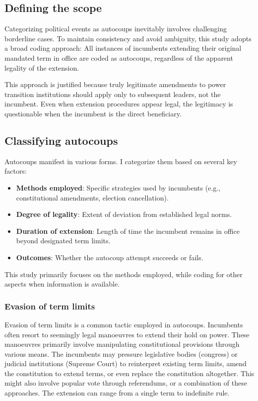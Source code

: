 \documentclass[
  12pt,
]{report}
\begin{document}
\subsection{Defining the scope}\label{defining-the-scope}

Categorizing political events as autocoups inevitably involves
challenging borderline cases. To maintain consistency and avoid
ambiguity, this study adopts a broad coding approach: All instances of
incumbents extending their original mandated term in office are coded as
autocoups, regardless of the apparent legality of the extension.

This approach is justified because truly legitimate amendments to power
transition institutions should apply only to subsequent leaders, not the
incumbent. Even when extension procedures appear legal, the legitimacy
is questionable when the incumbent is the direct beneficiary.

\subsection{Classifying autocoups}\label{sec-classify}

Autocoups manifest in various forms. I categorize them based on several
key factors:

\begin{itemize}
\item
  \textbf{Methods employed}: Specific strategies used by incumbents
  (e.g., constitutional amendments, election cancellation).
\item
  \textbf{Degree of legality}: Extent of deviation from established
  legal norms.
\item
  \textbf{Duration of extension}: Length of time the incumbent remains
  in office beyond designated term limits.
\item
  \textbf{Outcomes}: Whether the autocoup attempt succeeds or fails.
\end{itemize}

This study primarily focuses on the methods employed, while coding for
other aspects when information is available.

\subsubsection*{Evasion of term limits}\label{evasion-of-term-limits}

Evasion of term limits is a common tactic employed in autocoups.
Incumbents often resort to seemingly legal manoeuvres to extend their
hold on power. These manoeuvres primarily involve manipulating
constitutional provisions through various means. The incumbents may
pressure legislative bodies (congress) or judicial institutions (Supreme
Court) to reinterpret existing term limits, amend the constitution to
extend terms, or even replace the constitution altogether. This might
also involve popular vote through referendums, or a combination of these
approaches. The extension can range from a single term to indefinite
rule.
\end{document}

